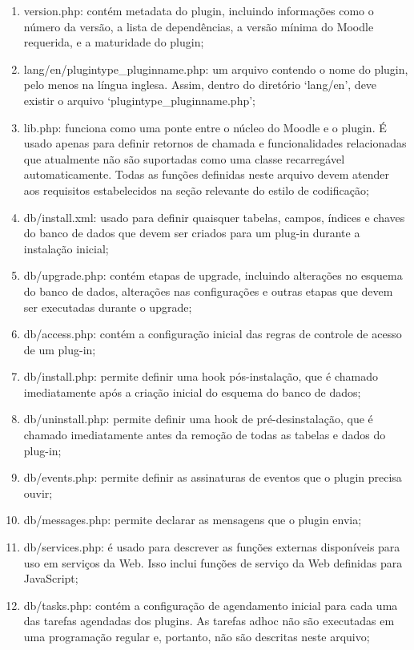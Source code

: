 \begin{enumerate} [label=(\alph*)]
    \item version.php: contém metadata do plugin, incluindo informações como o número da versão, a lista de dependências, a versão mínima do Moodle requerida, e a maturidade do plugin;
    \item lang/en/plugintype\_pluginname.php: um arquivo contendo o nome do plugin, pelo menos na língua inglesa. Assim, dentro do diretório ‘lang/en’, deve existir o arquivo ‘plugintype\_pluginname.php’;
    \item lib.php: funciona como uma ponte entre o núcleo do Moodle e o plugin. É usado apenas para definir retornos de chamada e funcionalidades relacionadas que atualmente não são suportadas como uma classe recarregável automaticamente. Todas as funções definidas neste arquivo devem atender aos requisitos estabelecidos na seção relevante do estilo de codificação;
    \item db/install.xml: usado para definir quaisquer tabelas, campos, índices e chaves do banco de dados que devem ser criados para um plug-in durante a instalação inicial;
    \item db/upgrade.php: contém etapas de upgrade, incluindo alterações no esquema do banco de dados, alterações nas configurações e outras etapas que devem ser executadas durante o upgrade;
    \item db/access.php: contém a configuração inicial das regras de controle de acesso de um plug-in;
    \item db/install.php: permite definir uma hook pós-instalação, que é chamado imediatamente após a criação inicial do esquema do banco de dados;
    \item db/uninstall.php: permite definir uma hook de pré-desinstalação, que é chamado imediatamente antes da remoção de todas as tabelas e dados do plug-in;
    \item db/events.php: permite definir as assinaturas de eventos que o plugin precisa ouvir;
    \item db/messages.php: permite declarar as mensagens que o plugin envia;
    \item db/services.php: é usado para descrever as funções externas disponíveis para uso em serviços da Web. Isso inclui funções de serviço da Web definidas para JavaScript;
    \item db/tasks.php: contém a configuração de agendamento inicial para cada uma das tarefas agendadas dos plugins. As tarefas adhoc não são executadas em uma programação regular e, portanto, não são descritas neste arquivo;

\end{enumerate}
